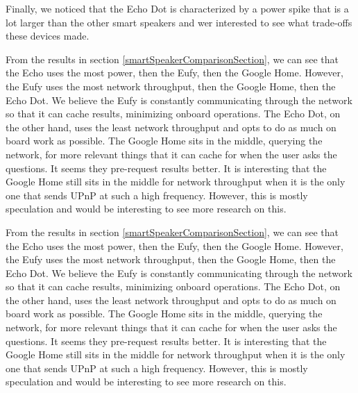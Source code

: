 Finally, we noticed that the Echo Dot is characterized by a power spike that is a lot larger than the other smart speakers and wer interested to see what trade-offs these devices made.

From the results in section \ref{smartSpeakerComparisonSection}, we can see that the Echo uses the most power, then the Eufy, then the Google Home. However, the Eufy uses the most network throughput, then the Google Home, then the Echo Dot. We believe the Eufy is constantly communicating through the network so that it can cache results, minimizing onboard operations. The Echo Dot, on the other hand, uses the least network throughput and opts to do as much on board work as possible. The Google Home sits in the middle, querying the network, for more relevant things that it can cache for when the user asks the questions. It seems they pre-request results better. It is interesting that the Google Home still sits in the middle for network throughput when it is the only one that sends UPnP at such a high frequency. However, this is mostly speculation and would be interesting to see more research on this.

From the results in section \ref{smartSpeakerComparisonSection}, we can see that the Echo uses the most power, then the Eufy, then the Google Home. However, the Eufy uses the most network throughput, then the Google Home, then the Echo Dot. We believe the Eufy is constantly communicating through the network so that it can cache results, minimizing onboard operations. The Echo Dot, on the other hand, uses the least network throughput and opts to do as much on board work as possible. The Google Home sits in the middle, querying the network, for more relevant things that it can cache for when the user asks the questions. It seems they pre-request results better. It is interesting that the Google Home still sits in the middle for network throughput when it is the only one that sends UPnP at such a high frequency. However, this is mostly speculation and would be interesting to see more research on this.